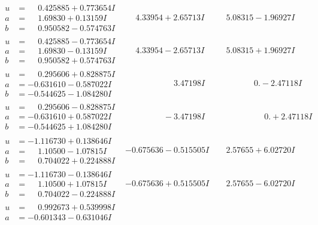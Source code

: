 \documentclass[1p]{elsarticle_modified}
\theoremstyle{definition}
\begin{document}
$$\begin{array}{c|c|c}
\begin{aligned}
u &= \phantom{-}0.425885 + 0.773654 I \\
a &= \phantom{-}1.69830 + 0.13159 I \\
b &= \phantom{-}0.950582 - 0.574763 I\end{aligned}
 & \phantom{-}4.33954 + 2.65713 I & \phantom{-}5.08315 - 1.96927 I \\ \hline\begin{aligned}
u &= \phantom{-}0.425885 - 0.773654 I \\
a &= \phantom{-}1.69830 - 0.13159 I \\
b &= \phantom{-}0.950582 + 0.574763 I\end{aligned}
 & \phantom{-}4.33954 - 2.65713 I & \phantom{-}5.08315 + 1.96927 I \\ \hline\begin{aligned}
u &= \phantom{-}0.295606 + 0.828875 I \\
a &= -0.631610 - 0.587022 I \\
b &= -0.544625 - 1.084280 I\end{aligned}
 & \phantom{-0.000000 -}3.47198 I & \phantom{-0.000000 } 0. - 2.47118 I \\ \hline\begin{aligned}
u &= \phantom{-}0.295606 - 0.828875 I \\
a &= -0.631610 + 0.587022 I \\
b &= -0.544625 + 1.084280 I\end{aligned}
 & \phantom{-0.000000 } -3.47198 I & \phantom{-0.000000 -}0. + 2.47118 I \\ \hline\begin{aligned}
u &= -1.116730 + 0.138646 I \\
a &= \phantom{-}1.10500 - 1.07815 I \\
b &= \phantom{-}0.704022 + 0.224888 I\end{aligned}
 & -0.675636 - 0.515505 I & \phantom{-}2.57655 + 6.02720 I \\ \hline\begin{aligned}
u &= -1.116730 - 0.138646 I \\
a &= \phantom{-}1.10500 + 1.07815 I \\
b &= \phantom{-}0.704022 - 0.224888 I\end{aligned}
 & -0.675636 + 0.515505 I & \phantom{-}2.57655 - 6.02720 I \\ \hline\begin{aligned}
u &= \phantom{-}0.992673 + 0.539998 I \\
a &= -0.601343 - 0.631046 I \\

\end{aligned}
\end{array}$$
\end{document}
